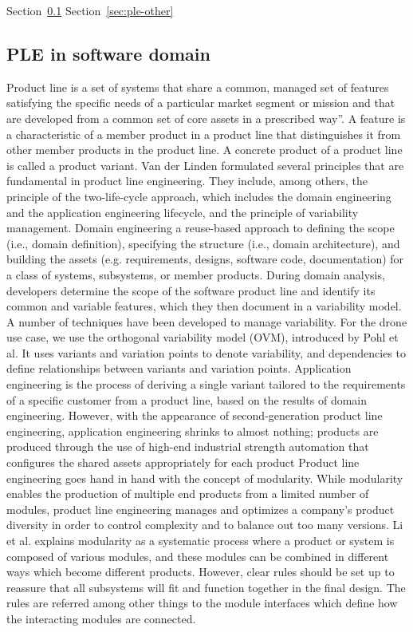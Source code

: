 \documentclass[sigconf,review]{acmart}
\begin{document}
Section~\ref{sec:ple-software}
Section~\ref{sec:ple-other}

\subsection{PLE in software domain}
\label{sec:ple-software}

Product line is a set of systems that share a common, managed set of features satisfying the specific needs of a particular market segment or mission and that are developed from a common set of core assets in a prescribed way”.
A feature is a characteristic of a member product in a product line that distinguishes it from other member products in the product line.
A concrete product of a product line is called a product variant.
Van der Linden formulated several principles that are fundamental in product line engineering. They include, among others, the principle of the two-life-cycle approach, which includes the domain engineering and the application engineering lifecycle, and the principle of variability management.
Domain engineering a reuse-based approach to defining the scope (i.e., domain definition), specifying the structure (i.e., domain architecture), and building the assets (e.g. requirements, designs, software code, documentation) for a class of systems, subsystems, or member products.
During domain analysis, developers determine the scope of the software product line and identify its common and variable features, which they then document in a variability model. 
A number of techniques have been developed to manage variability.
For the drone use case, we use the orthogonal variability model (OVM), introduced by Pohl et al. It uses variants and variation points to denote variability, and dependencies to define relationships between variants and variation points.
Application engineering is the process of deriving a single variant tailored to the requirements of a specific customer from a product line, based on the results of domain engineering. 
However, with the appearance of second-generation product line engineering, application engineering shrinks to almost nothing; products are produced through the use of high-end industrial strength automation that configures the shared assets appropriately for each product
Product line engineering goes hand in hand with the concept of modularity. While modularity enables the production of multiple end products from a limited number of modules, product line engineering manages and optimizes a company's product diversity in order to control complexity and to balance out too many versions.
Li et al. explains modularity as a systematic process where a product or system is composed of various modules, and these modules can be combined in different ways which become different products. However, clear rules should be set up to reassure that all subsystems will fit and function together in the final design.
The rules are referred among other things to the module interfaces which define how the interacting modules are connected. 
\end{document}
